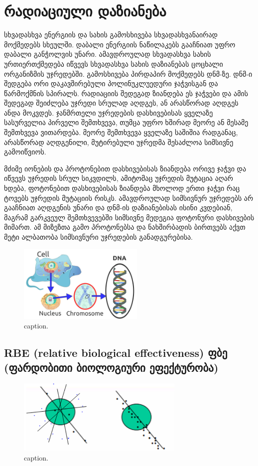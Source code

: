 \documentclass[12pt,a4paper,]{report}
\begin{document}
\section{რადიაციული დაზიანება}
სხვადასხვა ენერგიის და სახის გამოსხივება სხვადასხვანაირად მოქმედებს სხეულში. დაბალი ენერგიის ნაწილაკებს გააჩნიათ უფრო დაბალი განჭოლვის უნარი. ამავდროულად სხვადასხვა სახის ურთიერთქმედება იწვევს სხვადასხვა სახის დაზიანებას ცოცხალი ორგანიზმის უჯრედებში. გამოსხივება პირდაპირ მოქმედებს დნმ-ზე. 
დნმ-ი შედგება ორი დაკავშირებული პოლინუკლუედური ჯაჭვისგან და წარმოქმნის სპირალს. რადიაციის შედეგად ზიანდება ეს ჯაჭვები და ამის შედეგად შეიძლება უჯრედი სრულად აღდგეს, ან არასწორად აღდგეს ანდა მოკვდეს. ჯანმრთელი უჯრედების დასხივებისას ყველაზე სასურველია პირველი შემთხვევა, თუმცა უფრო ხშირად მეორე ან მესამე შემთხვევა ვითარდება. მეორე შემთხვევა ყველაზე საშიშია რადგანაც, არასწორად აღდგენილი, მუტირებული უჯრედმა შესაძლოა სიმსივნე გამოიწვიოს. 

მძიმე იონების და პროტონებით დასხივებისას ზიანდება ორივე ჯაჭვი და იწვევს უჯრედის სრულ სიკვდილს, ამიტომაც უჯრედის მუტაცია აღარ ხდება, ფოტონებით დასხივებისას ზიანდება მხოლოდ ერთი ჯაჭვი რაც ტოვებს უჯრედის მუტაციის რისკს. ამავდროულად სიმსივნურ უჯრედებს არ გააჩნიათ აღდგენის უნარი და დნმ-ის დაზიანებისას ისინი კვდებიან, მაგრამ გარკვეულ შემთხვევებში სიმსივნე მედეგია ფოტონური დასხივების მიმართ. ამ მიზეზთა გამო პროტონებსა და ნახშირბადის ბირთვებს აქვთ მეტი ალბათობა სიმსივნური უჯრედების განადგურებისა.

	\begin{figure}[htp]
	    \centering
        \includegraphics[width = 6cm]{images/Radiotherapy.jpg}
        \caption{caption.}
        \label{fig:1}
    \end{figure}

    \subsection{RBE (relative biological effectiveness)
 ფბე (ფარდობითი ბიოლოგიური ეფექტურობა) } 

	\begin{figure}[htp]
	    \centering
        \includegraphics[width = 8cm]{images/Picture1.png}
        \caption{caption.}
        \label{fig:1}
    \end{figure}
\end{document}
